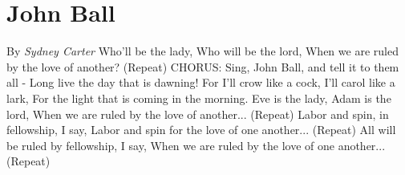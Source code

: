 \documentclass{article}%
\begin{document}
%
\newpage%
\section{John Ball}%
\label{johnball}%
By%
\textit{Sydney Carter}%
\newline%
Who’ll be the lady,\newline%
Who will be the lord,\newline%
When we are ruled by the love of another?\newline%
(Repeat)\newline%
\newline%
CHORUS:\newline%
Sing, John Ball, and tell it to them all {-}\newline%
Long live the day that is dawning!\newline%
For I'll crow like a cock,\newline%
I'll carol like a lark,\newline%
For the light that is coming in the morning.\newline%
\newline%
Eve is the lady, Adam is the lord,\newline%
When we are ruled by the love of another...\newline%
(Repeat)\newline%
\newline%
Labor and spin, in fellowship, I say,\newline%
Labor and spin for the love of one another...\newline%
(Repeat)\newline%
\newline%
All will be ruled by fellowship, I say,\newline%
When we are ruled by the love of one another...\newline%
(Repeat)\newline%
\newline%

%
\newpage%
\end{document}
